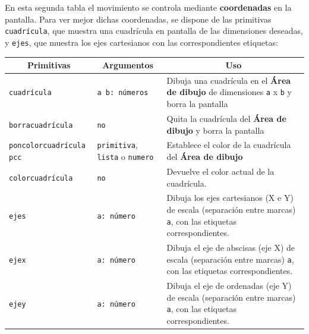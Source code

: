En esta segunda tabla el movimiento se controla mediante \textbf{coordenadas} en
la pantalla. Para ver mejor dichas coordenadas, se dispone de las primitivas
\texttt{cuadr\'icula}, que muestra una cuadr\'icula en pantalla de las dimensiones
deseadas, y \texttt{ejes}, que muestra los ejes cartesianos con las correspondientes 
etiquetas: 
\begin{center}
 \begin{longtable}{|m{3.5cm}|m{3cm}|m{8.5cm}|} \hline
   \multicolumn{1}{|c|}{\textbf{Primitivas}} & 
      \multicolumn{1}{c|}{\textbf{Argumentos}} &
         \multicolumn{1}{c|}{\textbf{Uso}} \\ \endhead \hline
   \texttt{cuadr\'icula} \index{cuadr\'icula@\texttt{cuadr\'icula}} &
      \texttt{a b: n\'umeros} &
        Dibuja una cuadr\'icula en el \textbf{\'Area de dibujo} de dimensiones 
         \texttt{a} x \texttt{b} y borra la pantalla\\ \hline
   \texttt{borracuadr\'icula}\index{borracuadr\'icula@\texttt{borracuadr\'icula}}
      & \texttt{no} &
        Quita la cuadr\'icula del \textbf{\'Area de dibujo} y borra la pantalla
          \\ \hline
 \texttt{poncolorcuadr\'icula}\index{poncolorcuadr\'icula@\texttt{poncolorcuadr\'icula}}
      \texttt{pcc}\index{pcc@\texttt{pcc}} &
      \texttt{primitiva}, \texttt{lista} o \texttt{numero} &
        Establece el color de la cuadr\'icula del \textbf{\'Area de dibujo}
          \\ \hline
   \texttt{colorcuadr\'icula}\index{colorcuadr\'icula@\texttt{colorcuadr\'icula}} & 
      \texttt{no} &
        Devuelve el color actual de la cuadr\'icula. \\ \hline
   \texttt{ejes}\index{ejes@\texttt{ejes}}&
      \texttt{a: n\'umero}  &
        Dibuja los ejes cartesianos (X e Y) de escala (separaci\'on entre marcas)
        \texttt{a}, con las etiquetas correspondientes.
          \\ \hline
   \texttt{ejex}\index{ejex@\texttt{ejex}}&
      \texttt{a: n\'umero}  &
        Dibuja el eje de abscisas (eje X) de escala (separaci\'on entre marcas)
        \texttt{a}, con las etiquetas correspondientes.
          \\ \hline
   \texttt{ejey}\index{ejey@\texttt{ejey}}&
      \texttt{a: n\'umero}  &
        Dibuja el eje de ordenadas (eje Y) de escala (separaci\'on entre marcas)
        \texttt{a}, con las etiquetas correspondientes.
          \\ \hline

\end{longtable}
\end{center}
